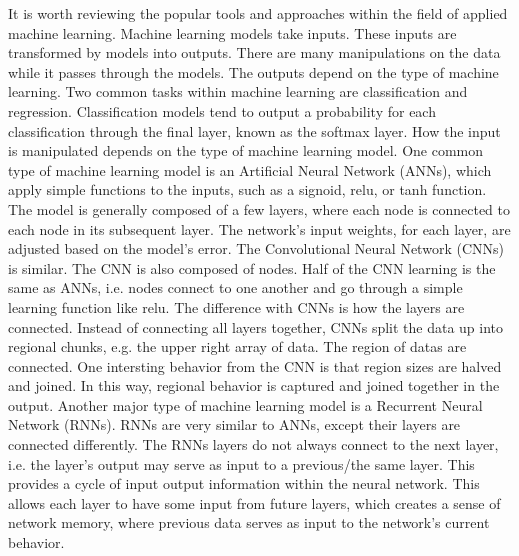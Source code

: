 It is worth reviewing the popular tools and approaches within the field of applied machine learning.  Machine learning models take inputs.  These inputs are transformed by models into outputs.  There are many manipulations on the data while it passes through the models.  The outputs depend on the type of machine learning.  Two common tasks within machine learning are classification and regression.  Classification models tend to output a probability for each classification through the final layer, known as the softmax layer.  How the input is manipulated depends on the type of machine learning model.  One common type of machine learning model is an Artificial Neural Network (ANNs), which apply simple functions to the inputs, such as a signoid, relu, or tanh function.  The model is generally composed of a few layers, where each node is connected to each node in its subsequent layer.  The network's input weights, for each layer, are adjusted based on the model's error.  The Convolutional Neural Network (CNNs) is similar.  The CNN is also composed of nodes.  Half of the CNN learning is the same as ANNs, i.e. nodes connect to one another and go through a simple learning function like relu.  The difference with CNNs is how the layers are connected.  Instead of connecting all layers together, CNNs split the data up into regional chunks, e.g. the upper right array of data.  The region of datas are connected.  One intersting behavior from the CNN is that region sizes are halved and joined.  In this way, regional behavior is captured and joined together in the output.  Another major type of machine learning model is a Recurrent Neural Network (RNNs).  RNNs are very similar to ANNs, except their layers are connected differently.  The RNNs layers do not always connect to the next layer, i.e. the layer's output may serve as input to a previous/the same layer.  This provides a cycle of input output information within the neural network.  This allows each layer to have some input from future layers, which creates a sense of network memory, where previous data serves as input to the network's current behavior.  
